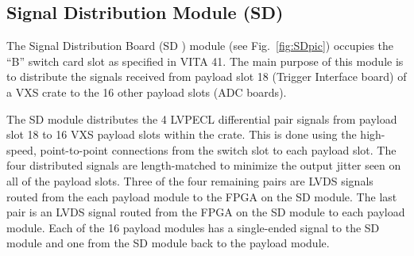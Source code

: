 
	
\subsection{Signal Distribution Module (SD)}

The Signal Distribution Board (SD \cite{sd-ref}) module (see Fig.~\ref{fig:SDpic}) occupies the “B” switch card slot as specified in VITA 41. The main purpose of this module is to distribute the signals received from payload slot 18 (Trigger Interface board) of a VXS crate to the 16 other payload slots (ADC boards).

The SD module distributes the 4 LVPECL differential pair  signals from payload slot 18 to 16 VXS payload slots within the crate. This is done using the high-speed, point-to-point connections from the switch slot to each payload slot. The four distributed signals are length-matched to minimize the output jitter seen on all of the payload slots. Three of the four remaining pairs are LVDS signals routed from the each payload module to the FPGA on the SD module. The last pair is an LVDS signal routed from the FPGA on the SD module to each payload module. Each of the 16 payload modules has a single-ended signal to the SD module and one from the SD module back to the payload module.

